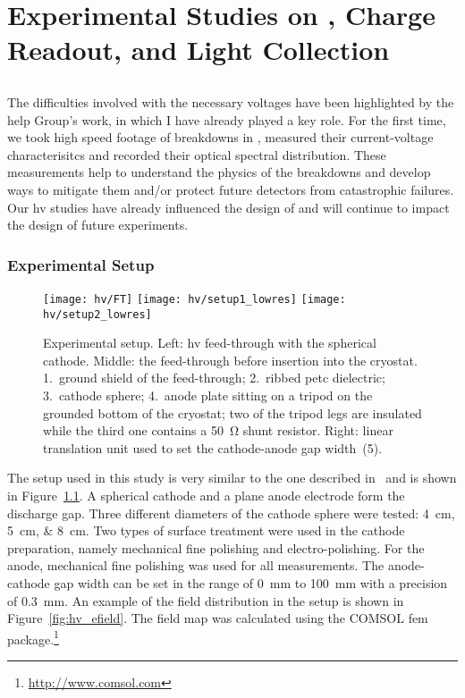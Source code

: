 \chapter{Experimental Studies on , Charge Readout, and Light Collection}
\label{chap:studies}


\section{}
\label{sec:studies_hv}

The difficulties involved with the necessary voltages have been highlighted by the \gls{help} Group’s work, in which I have already played a key role\cite{breakdown_16}.
For the first time, we took high speed footage of breakdowns in \lar{}, measured their current-voltage characterisitcs and recorded their optical spectral distribution.
These measurements help to understand the physics of the breakdowns and develop ways to mitigate them and/or protect future detectors from catastrophic failures.
Our \gls{hv} studies have already influenced the design of \uboone{} and will continue to impact the design of future experiments.


\subsection{Experimental Setup}
\label{sec:studies_hv_setup}

\begin{figure}[htb]
	\centering	
	\texttt{[image: hv/FT]}
	\texttt{[image: hv/setup1\_lowres]}
	\texttt{[image: hv/setup2\_lowres]}
	\caption[ test setup]{%
		Experimental setup.
		Left: \acrshort{hv} feed-through with the spherical cathode.
		Middle: the feed-through before insertion into the cryostat.
		1.~ground shield of the feed-through; 2.~ribbed \acrshort{petc} dielectric; 3.~cathode sphere; 4.~anode plate sitting on a tripod on the grounded bottom of the cryostat; two of the tripod legs are insulated while the third one contains a \SI{50}{\ohm} shunt resistor.
		Right: linear translation unit used to set the cathode-anode gap width~(5).
	}
	\label{fig:hv_setup1}
\end{figure}

The setup used in this study is very similar to the one described in~\cite{breakdown_14} and is shown in Figure~\ref{fig:hv_setup1}.
A spherical cathode and a plane anode electrode form the discharge gap.
Three different diameters of the cathode sphere were tested: \SIlist{4; 5; 8}{\centi\metre}.
Two types of surface treatment were used in the cathode preparation, namely mechanical fine polishing and electro-polishing.
For the anode, mechanical fine polishing was used for all measurements.
The anode-cathode gap width can be set in the range of \SI{0}{\milli\metre} to \SI{100}{\milli\metre} with a precision of \SI{0.3}{\milli\metre}.
An example of the field distribution in the setup is shown in Figure~\ref{fig:hv_efield}.
The field map was calculated using the COMSOL \gls{fem} package.\footnote{\url{http://www.comsol.com}}

